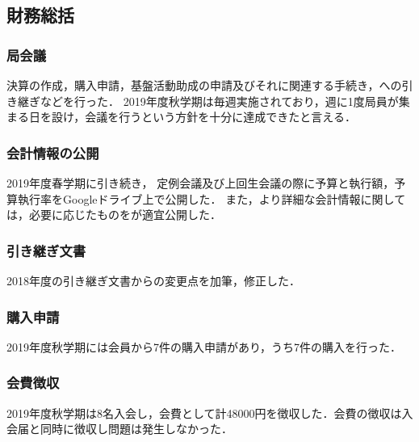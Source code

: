 \subsection*{財務総括}

\subsubsection*{局会議}
決算の作成，購入申請，基盤活動助成の申請及びそれに関連する手続き，\firstGrade{}への引き継ぎなどを行った．
2019年度秋学期は毎週実施されており，週に1度局員が集まる日を設け，会議を行うという方針を十分に達成できたと言える．

\subsubsection*{会計情報の公開}
2019年度春学期に引き続き， 定例会議及び上回生会議の際に予算と執行額，予算執行率をGoogleドライブ上で公開した．
また，より詳細な会計情報に関しては，必要に応じたものを\kaikeiStaff{}が適宜公開した．

\subsubsection*{引き継ぎ文書}
2018年度の引き継ぎ文書からの変更点を加筆，修正した．

\subsubsection*{購入申請}
2019年度秋学期には会員から7件の購入申請があり，うち7件の購入を行った．

\subsubsection*{会費徴収}
2019年度秋学期は8名入会し，会費として計48000円を徴収した．会費の徴収は入会届と同時に徴収し問題は発生しなかった．
